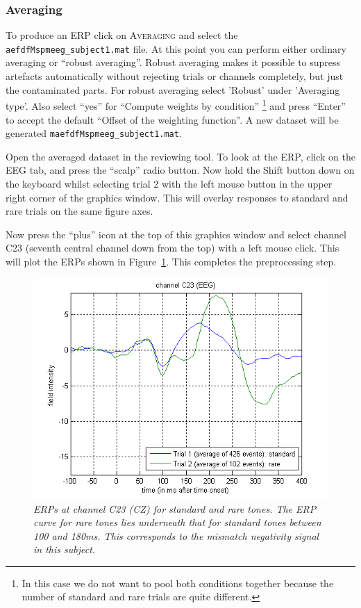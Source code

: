 \subsubsection{Averaging}
To produce an ERP click on \textsc{Averaging} and select the \texttt{aefdfMspmeeg\_subject1.mat} file. At this point you can perform either ordinary averaging or ``robust averaging''. Robust averaging makes it possible to supress artefacts automatically without rejecting trials or channels completely, but just the contaminated parts. For robust averaging select 'Robust' under 'Averaging type'.  Also select ``yes'' for ``Compute weights by condition'' \footnote{In this case we do not want to pool both conditions together because the number of standard and rare trials are quite different.} and press ``Enter'' to accept the default ``Offset of the weighting function''. A new dataset will be generated \texttt{maefdfMspmeeg\_subject1.mat}.

Open the averaged dataset in the reviewing tool. To look at the ERP, click on the EEG tab, and press the ``scalp'' radio button. Now hold  the Shift button down on the keyboard whilst selecting trial 2 with the left mouse button in the upper right corner of the graphics window. This will overlay responses to standard and rare trials on the same figure axes.

Now press the ``plus'' icon at the top of this graphics window and select channel C23 (seventh central channel down from the top) with a left mouse click. This will plot the ERPs shown in Figure~\ref{c23}. This completes the preprocessing step.
\begin{figure}
\begin{center}
\includegraphics[width=120mm]{mmn/erp_c23}
\caption{\em ERPs at channel C23 (CZ) for standard and rare tones. The ERP curve for rare tones lies underneath that for standard tones between 100 and 180ms. This corresponds to the mismatch negativity signal in this subject. \label{c23}}
\end{center}
\end{figure}

